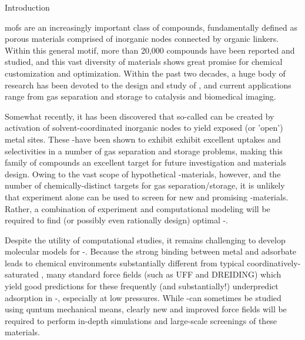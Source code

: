 \begin{section}{Introduction}

\Glspl{mof} are an increasingly important class of compounds, 
fundamentally defined as porous
materials comprised of inorganic nodes connected by organic linkers. Within
this general motif, more than 20,000 compounds have been reported and
studied,\cite{Furukawa2013} and this vast diversity of \mof materials shows great promise
for chemical customization and optimization. Within the past two decades, a
huge body of research has been devoted to the design and study of \mofs, and
current applications range from gas separation and storage to catalysis and
biomedical imaging.\cite{Furukawa2013}

Somewhat recently, it has been discovered that so-called \cus \mofs can be
created by activation of solvent-coordinated inorganic nodes to yield exposed
(or 'open') metal sites.\cite{Millward2005b,Dietzel2009,Dzubak2012} These \cus-\mofs have
been shown to exhibit exhibit excellent uptakes and selectivities in a number
of gas separation and storage problems,\cite{Czaja2009,Millward2005b,Dietzel2009}
making this family of compounds an excellent target for future
investigation and materials design. Owing to the vast scope of hypothetical
\cus-\mof materials, however, and the number of chemically-distinct targets
for gas separation/storage, it is unlikely that experiment alone can
be used to screen for new and promising \cus-\mof materials.\cite{Krishna2011} 
Rather, a combination of
experiment and computational modeling will be required to find (or possibly
even rationally design) optimal \cus-\mofs.\cite{Getman2012,Czaja2009,Krishna2011}

Despite the utility of computational studies, it remains challenging to
develop molecular models for \cus-\mofs.\cite{Dzubak2012} Because the strong
binding between metal and adsorbate leads to chemical environments
substantially different from typical coordinatively-saturated \mofs, many
standard force fields (such as UFF and DREIDING) which yield good predictions
for these \mofs frequently (and substantially!) underpredict adsorption in
\cus-\mofs, especially at low
pressures.\cite{Yazaydin2009,Krishna2011,Getman2012} While \cus-\mofs can
sometimes be studied using quntum mechanical
means,\cite{Getman2012,Valenzano2010} clearly
new and improved force fields will be required to perform in-depth simulations
and large-scale screenings of these materials.


\end{section}
